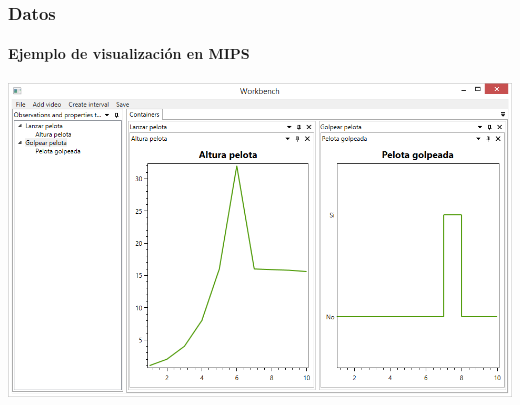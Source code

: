 \begin{frame}
	\frametitle{Datos}
	\framesubtitle{Ejemplo de visualizaci\'on en MIPS}
	\begin{center}
		\includegraphics[width=1.0\linewidth]{./Figures/EjemploObservacion.PNG}
	\end{center}
\end{frame}